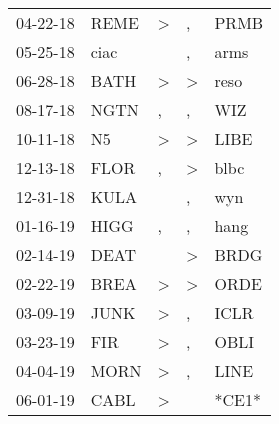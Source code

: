 \begin{supertabular}{p{0.07\textwidth}p{0.06\textwidth}p{0.02\textwidth}p{0.02\textwidth}p{0.06\textwidth}}
          04-22-18\textsuperscript{} &           REME\textsuperscript{} &     \textgreater &                , &           PRMB\textsuperscript{} \\
          05-25-18\textsuperscript{} &           ciac\textsuperscript{} &                  &                , &           arms\textsuperscript{} \\
          06-28-18\textsuperscript{} &           BATH\textsuperscript{} &     \textgreater &     \textgreater &           reso\textsuperscript{} \\
          08-17-18\textsuperscript{} &           NGTN\textsuperscript{} &                , &                , &            WIZ\textsuperscript{} \\
          10-11-18\textsuperscript{} &             N5\textsuperscript{} &     \textgreater &     \textgreater &           LIBE\textsuperscript{} \\
          12-13-18\textsuperscript{} &           FLOR\textsuperscript{} &                , &     \textgreater &           blbc\textsuperscript{} \\
          12-31-18\textsuperscript{} &           KULA\textsuperscript{} &                  &                , &            wyn\textsuperscript{} \\
          01-16-19\textsuperscript{} &           HIGG\textsuperscript{} &                , &                , &           hang\textsuperscript{} \\
          02-14-19\textsuperscript{} &           DEAT\textsuperscript{} &                  &     \textgreater &           BRDG\textsuperscript{} \\
          02-22-19\textsuperscript{} &           BREA\textsuperscript{} &     \textgreater &     \textgreater &           ORDE\textsuperscript{} \\
          03-09-19\textsuperscript{} &           JUNK\textsuperscript{} &     \textgreater &                , &           ICLR\textsuperscript{} \\
          03-23-19\textsuperscript{} &            FIR\textsuperscript{} &     \textgreater &                , &           OBLI\textsuperscript{} \\
          04-04-19\textsuperscript{} &           MORN\textsuperscript{} &     \textgreater &                , &           LINE\textsuperscript{} \\
          06-01-19\textsuperscript{} &           CABL\textsuperscript{} &     \textgreater &                  &                            *CE1* \\

\end{supertabular}
